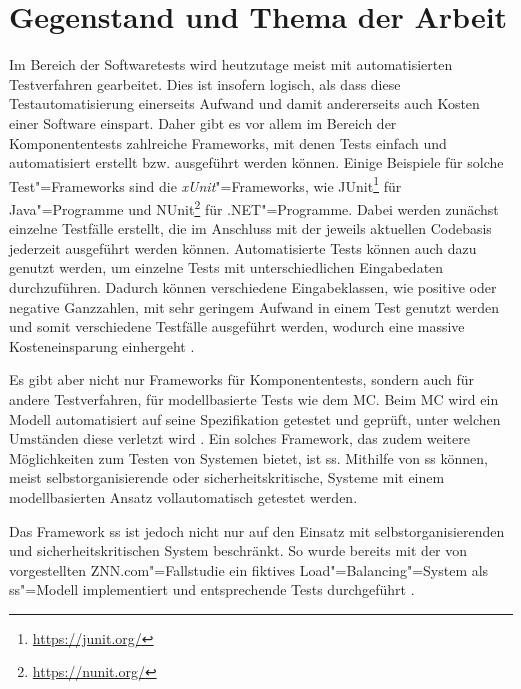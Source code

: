 \chapter{Gegenstand und Thema der Arbeit}
\label{ch:intro}

Im Bereich der Softwaretests wird heutzutage meist mit automatisierten Testverfahren gearbeitet.
Dies ist insofern logisch, als dass diese Testautomatisierung einerseits Aufwand und damit andererseits auch Kosten einer Software einspart.
Daher gibt es vor allem im Bereich der Komponententests zahlreiche Frameworks, mit denen Tests einfach und automatisiert erstellt bzw. ausgeführt werden können.
Einige Beispiele für solche Test"=Frameworks sind die \emph{xUnit}"=Frameworks, wie JUnit\footnote{\url{https://junit.org/}} für Java"=Programme und NUnit\footnote{\url{https://nunit.org/}} für .NET"=Programme.
Dabei werden zunächst einzelne Testfälle erstellt, die im Anschluss mit der jeweils aktuellen Codebasis jederzeit ausgeführt werden können.
Automatisierte Tests können auch dazu genutzt werden, um einzelne Tests mit unterschiedlichen Eingabedaten durchzuführen.
Dadurch können verschiedene Eingabeklassen, wie \zB positive oder negative Ganzzahlen, mit sehr geringem Aufwand in einem Test genutzt werden und somit verschiedene Testfälle ausgeführt werden, wodurch eine massive Kosteneinsparung einhergeht \cite{Polo2013}.

Es gibt aber nicht nur Frameworks für Komponententests, sondern auch für andere Testverfahren, \zB für modellbasierte Tests wie dem \gls{MC}.
Beim \gls{MC} wird ein Modell automatisiert auf seine Spezifikation getestet und geprüft, unter welchen Umständen diese verletzt wird \cite{Grumberg1999,Habermaier2015}.
Ein solches Framework, das zudem weitere Möglichkeiten zum Testen von Systemen bietet, ist \gls{ss}.
Mithilfe von \gls{ss} können, meist selbstorganisierende oder sicherheitskritische, Systeme mit einem modellbasierten Ansatz vollautomatisch getestet werden.

Das Framework \gls{ss} ist jedoch nicht nur auf den Einsatz mit selbstorganisierenden und sicherheitskritischen System beschränkt.
So wurde bereits mit der von \citeauthor{Cheng2008} vorgestellten ZNN.com"=Fallstudie \cite{Cheng2008} ein fiktives Load"=Balancing"=System als \gls{ss}"=Modell implementiert und entsprechende Tests durchgeführt \cite{Eberhardinger2017}.

